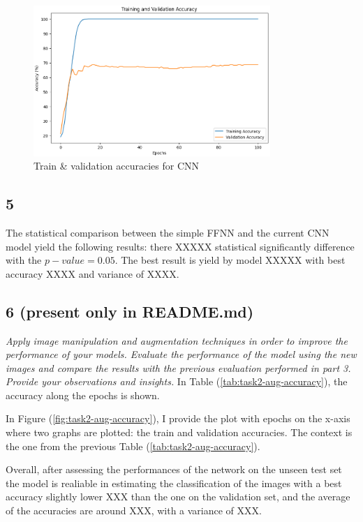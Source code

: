 \documentclass[11pt]{scrartcl}
\begin{document}
\begin{figure}[htbp]
\centering
\includegraphics[width=0.8\textwidth]{./figures/task2-accuracy.png}
\caption{Train \& validation accuracies for CNN}
\label{fig:task2-accuracy}
\end{figure}


\subsection*{5}

The statistical comparison between the simple FFNN and the current CNN model yield 
the following results:
there XXXXX statistical significantly difference with the \( p-value = 0.05 \).
The best result is yield by model XXXXX with best accuracy XXXX and variance of XXXX.

\subsection*{6 (present only in README.md)}
\textit{
Apply image manipulation and augmentation techniques in order to improve the performance of your models. 
Evaluate the performance of the model using the new images 
and compare the results with the previous evaluation performed in part 3. 
Provide your observations and insights.
}
In Table (\ref{tab:task2-aug-accuracy}),
the accuracy along the epochs is shown.

In Figure (\ref{fig:task2-aug-accuracy}), 
I provide the plot with epochs on the x-axis where two graphs are plotted:
the train and validation accuracies.
The context is the one from the previous Table (\ref{tab:task2-aug-accuracy}). 

Overall, after assessing the performances of the network on the unseen test set
the model is realiable in estimating the classification of the images with
a best accuracy slightly lower XXX than the one on the validation set,
and the average of the accuracies are around XXX,
with a variance of XXX.
\end{document}
